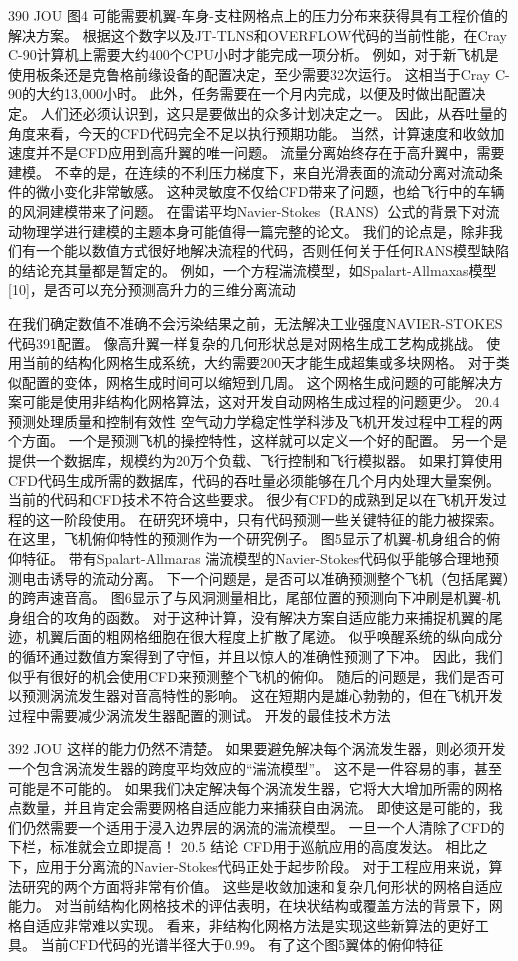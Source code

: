 \documentclass[UTF8,11pt,a4paper,openany,fontset=fandol]{ctexbook}
\begin{document}
390 JOU 图4 可能需要机翼-车身-支柱网格点上的压力分布来获得具有工程价值的解决方案。 根据这个数字以及JT-TLNS和OVERFLOW代码的当前性能，在Cray C-90计算机上需要大约400个CPU小时才能完成一项分析。 例如，对于新飞机是使用板条还是克鲁格前缘设备的配置决定，至少需要32次运行。 这相当于Cray C-90的大约13,000小时。 此外，任务需要在一个月内完成，以便及时做出配置决定。 人们还必须认识到，这只是要做出的众多计划决定之一。 因此，从吞吐量的角度来看，今天的CFD代码完全不足以执行预期功能。 当然，计算速度和收敛加速度并不是CFD应用到高升翼的唯一问题。 流量分离始终存在于高升翼中，需要建模。 不幸的是，在连续的不利压力梯度下，来自光滑表面的流动分离对流动条件的微小变化非常敏感。 这种灵敏度不仅给CFD带来了问题，也给飞行中的车辆的风洞建模带来了问题。 在雷诺平均Navier-Stokes（RANS）公式的背景下对流动物理学进行建模的主题本身可能值得一篇完整的论文。 我们的论点是，除非我们有一个能以数值方式很好地解决流程的代码，否则任何关于任何RANS模型缺陷的结论充其量都是暂定的。 例如，一个方程湍流模型，如Spalart-Allmaxas模型[10]，是否可以充分预测高升力的三维分离流动

在我们确定数值不准确不会污染结果之前，无法解决工业强度NAVIER-STOKES代码391配置。 像高升翼一样复杂的几何形状总是对网格生成工艺构成挑战。 使用当前的结构化网格生成系统，大约需要200天才能生成超集或多块网格。 对于类似配置的变体，网格生成时间可以缩短到几周。 这个网格生成问题的可能解决方案可能是使用非结构化网格算法，这对开发自动网格生成过程的问题更少。 20.4 预测处理质量和控制有效性 空气动力学稳定性学科涉及飞机开发过程中工程的两个方面。 一个是预测飞机的操控特性，这样就可以定义一个好的配置。 另一个是提供一个数据库，规模约为20万个负载、飞行控制和飞行模拟器。 如果打算使用CFD代码生成所需的数据库，代码的吞吐量必须能够在几个月内处理大量案例。 当前的代码和CFD技术不符合这些要求。 很少有CFD的成熟到足以在飞机开发过程的这一阶段使用。 在研究环境中，只有代码预测一些关键特征的能力被探索。 在这里，飞机俯仰特性的预测作为一个研究例子。 图5显示了机翼-机身组合的俯仰特征。 带有Spalart-Allmaras 湍流模型的Navier-Stokes代码似乎能够合理地预测电击诱导的流动分离。 下一个问题是，是否可以准确预测整个飞机（包括尾翼）的跨声速音高。 图6显示了与风洞测量相比，尾部位置的预测向下冲刷是机翼-机身组合的攻角的函数。 对于这种计算，没有解决方案自适应能力来捕捉机翼的尾迹，机翼后面的粗网格细胞在很大程度上扩散了尾迹。 似乎唤醒系统的纵向成分的循环通过数值方案得到了守恒，并且以惊人的准确性预测了下冲。 因此，我们似乎有很好的机会使用CFD来预测整个飞机的俯仰。 随后的问题是，我们是否可以预测涡流发生器对音高特性的影响。 这在短期内是雄心勃勃的，但在飞机开发过程中需要减少涡流发生器配置的测试。 开发的最佳技术方法

392 JOU 这样的能力仍然不清楚。 如果要避免解决每个涡流发生器，则必须开发一个包含涡流发生器的跨度平均效应的“湍流模型”。 这不是一件容易的事，甚至可能是不可能的。 如果我们决定解决每个涡流发生器，它将大大增加所需的网格点数量，并且肯定会需要网格自适应能力来捕获自由涡流。 即使这是可能的，我们仍然需要一个适用于浸入边界层的涡流的湍流模型。 一旦一个人清除了CFD的下栏，标准就会立即提高！ 20.5 结论 CFD用于巡航应用的高度发达。 相比之下，应用于分离流的Navier-Stokes代码正处于起步阶段。 对于工程应用来说，算法研究的两个方面将非常有价值。 这些是收敛加速和复杂几何形状的网格自适应能力。 对当前结构化网格技术的评估表明，在块状结构或覆盖方法的背景下，网格自适应非常难以实现。 看来，非结构化网格方法是实现这些新算法的更好工具。 当前CFD代码的光谱半径大于0.99。 有了这个图5翼体的俯仰特征
\end{document}
